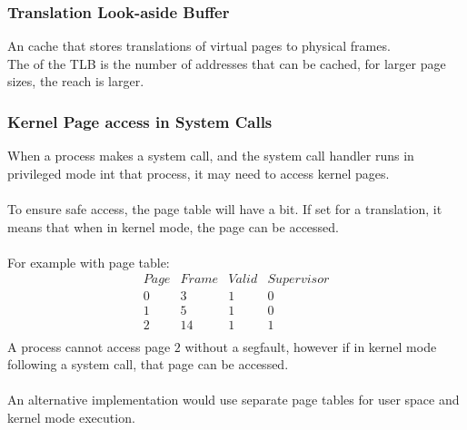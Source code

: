 \documentclass{report}
\begin{document}
\subsubsection*{Translation Look-aside Buffer}
An  cache that stores translations of virtual pages to physical frames.
\\
The  of the TLB is the number of addresses that can be cached, for larger page sizes, the reach is larger.
\subsubsection*{Kernel Page access in System Calls}
When a process makes a system call, and the system call handler runs in privileged mode int that process, it may need to access kernel pages.
\\
\\ To ensure safe access, the page table will have a  bit. If set for a translation, it means that when in kernel mode, the page can be accessed.
\\
\\ For example with page table:
\[\begin{matrix}
		Page & Frame & Valid & Supervisor \\
		0    & 3     & 1     & 0          \\
		1    & 5     & 1     & 0          \\
		2    & 14    & 1     & 1          \\
	\end{matrix}\]
A process cannot access page $2$ without a segfault, however if in kernel mode following a system call, that page can be accessed.
\\
\\ An alternative implementation would use separate page tables for user space and kernel mode execution.
\end{document}
